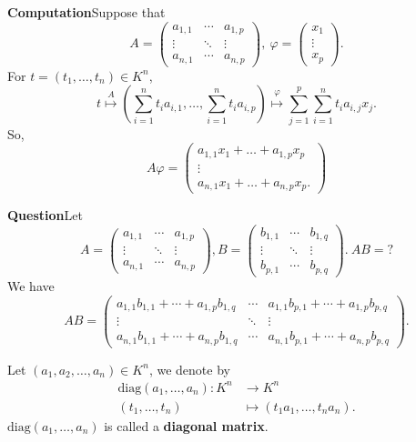 \documentclass{book}
\numberwithin{equation}{section}
\begin{document}
\begin{box2}
\textbf{Computation}\quad Suppose that 
$$A=\begin{pmatrix}  
  a_{1,1} & \cdots & a_{1,p} \\  
  \vdots & \ddots & \vdots \\  
  a_{n,1} & \cdots & a_{n,p}  
\end{pmatrix} ,\ \varphi =\begin{pmatrix}
 x_1\\
 \vdots\\
x_p

\end{pmatrix}.$$
For $t=(t_1, \dots, t_n)\in K^n$, 
$$t\overset{A}{\longmapsto}\left(\sum_{i=1}^{n}t_ia_{i,1},\dots,\sum_{i=1}^{n}t_ia_{i,p} \right)\overset{\varphi}{\longmapsto}\sum_{j=1}^{p}\sum_{i=1}^{n}t_ia_{i,j}x_j.$$
So, 
$$A\varphi=\begin{pmatrix}
    a_{1,1}x_1+\dots+a_{1,p}x_p\\
    \vdots\\
    a_{n,1}x_1+\dots+a_{n,p}x_p.
\end{pmatrix}$$
\end{box2}
\begin{box2}
    \textbf{Question}\quad Let 
    $$A=\begin{pmatrix}  
  a_{1,1} & \cdots & a_{1,p} \\  
  \vdots & \ddots & \vdots \\  
  a_{n,1} & \cdots & a_{n,p}  
\end{pmatrix} ,B=\begin{pmatrix}  
  b_{1,1} & \cdots & b_{1,q} \\  
  \vdots & \ddots & \vdots \\  
  b_{p,1} & \cdots & b_{p,q}  
\end{pmatrix} . \ AB=? $$
    We have
    $$AB=\begin{pmatrix}  
  a_{1,1}b_{1,1}+\cdots+a_{1,p}b_{1,q} & \cdots & a_{1,1}b_{p,1}+\cdots+a_{1,p}b_{p,q} \\  
  \vdots & \ddots & \vdots \\  
  a_{n,1}b_{1,1}+\cdots+a_{n,p}b_{1,q} & \cdots & a_{n,1}b_{p,1}+\cdots+a_{n,p}b_{p,q}  
\end{pmatrix} .$$
\end{box2}
\begin{exampleenv}
    Let $(a_1,a_2,\dots,a_n)\in K^n$, we denote by 
    \begin{align*}
        \mathrm{diag}(a_1,\dots,a_n):K^n&\longrightarrow K^n\\
        (t_1,\dots,t_n)&\longmapsto(t_1a_1,\dots,t_na_n).
    \end{align*}
    $\mathrm{diag}(a_1,\dots,a_n)$ is called a \textbf{diagonal matrix}.
\end{exampleenv}
\end{document}
